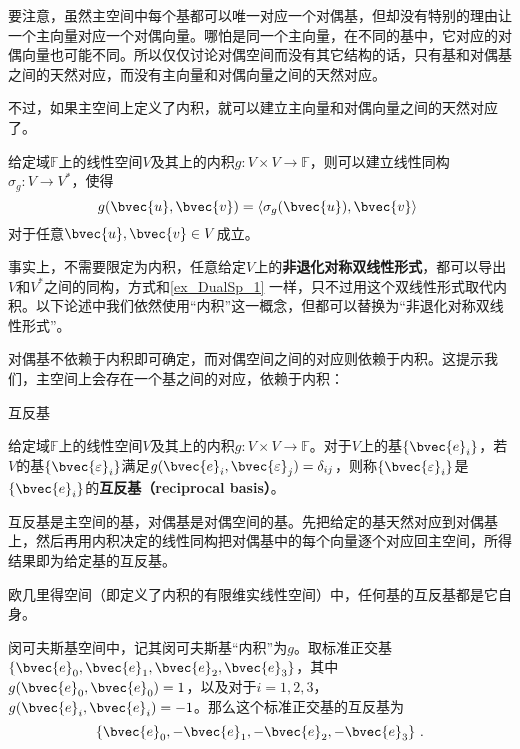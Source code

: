 要注意，虽然主空间中每个基都可以唯一对应一个对偶基，但却没有特别的理由让一个主向量对应一个对偶向量。哪怕是同一个主向量，在不同的基中，它对应的对偶向量也可能不同。所以仅仅讨论对偶空间而没有其它结构的话，只有基和对偶基之间的天然对应，而没有主向量和对偶向量之间的天然对应。



不过，如果主空间上定义了内积，就可以建立主向量和对偶向量之间的天然对应了。



\begin{example}{}\label{ex_DualSp_1}

给定域$\mathbb{F}$上的线性空间$V$及其上的内积$g:V\times V\to \mathbb{F}$，则可以建立线性同构$\sigma_g: V\to V^*$，使得
\begin{equation}
g(\bvec{u}, \bvec{v}) = \langle \sigma_g(\bvec{u}) , \bvec{v} \rangle~
\end{equation}
对于任意$\bvec{u}, \bvec{v}\in V$成立。

\end{example}



事实上，不需要限定为内积，任意给定$V$上的\textbf{非退化对称双线性形式}，都可以导出$V$和$V^*$之间的同构，方式和\autoref{ex_DualSp_1} 一样，只不过用这个双线性形式取代内积。以下论述中我们依然使用“内积”这一概念，但都可以替换为“非退化对称双线性形式”。



对偶基不依赖于内积即可确定，而对偶空间之间的对应则依赖于内积。这提示我们，主空间上会存在一个基之间的对应，依赖于内积：

\begin{definition}{互反基}

给定域$\mathbb{F}$上的线性空间$V$及其上的内积$g:V\times V\to \mathbb{F}$。对于$V$上的基$\{\bvec{e}_i\}$，若$V$的基$\{\bvec{\varepsilon}_i\}$满足$g(\bvec{e}_i, \bvec{\varepsilon}_j)=\delta_{ij}$，则称$\{\bvec{\varepsilon}_i\}$是$\{\bvec{e}_i\}$的\textbf{互反基（reciprocal basis）}。

\end{definition}


互反基是主空间的基，对偶基是对偶空间的基。先把给定的基天然对应到对偶基上，然后再用内积决定的线性同构把对偶基中的每个向量逐个对应回主空间，所得结果即为给定基的互反基。




\begin{example}{}

欧几里得空间（即定义了内积的有限维实线性空间）中，任何基的互反基都是它自身。

闵可夫斯基空间中，记其闵可夫斯基“内积”为$g$。取标准正交基$\{\bvec{e}_0, \bvec{e}_1, \bvec{e}_2, \bvec{e}_3\}$，其中$g(\bvec{e}_0, \bvec{e}_0)=1$，以及对于$i=1, 2, 3$，$g(\bvec{e}_i, \bvec{e}_i)=-1$。那么这个标准正交基的互反基为
\begin{equation}
\{\bvec{e}_0, -\bvec{e}_1, -\bvec{e}_2, -\bvec{e}_3\}~. 
\end{equation}

\end{example}











